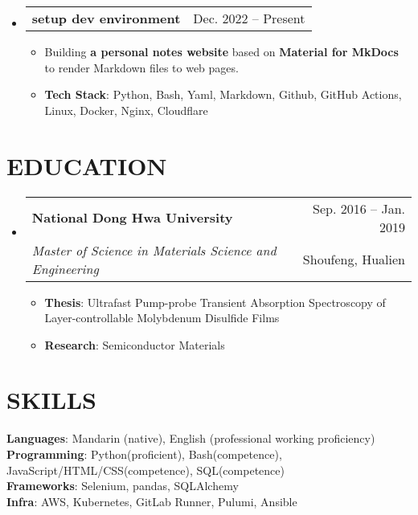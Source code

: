 \documentclass[letterpaper,11pt]{article}
\makeatletter
\newcommand{\resumeItem}[1]{
  \item\small{
    {#1 \vspace{-1pt}}
  }
}
\newcommand{\resumeSubheading}[4]{
  \vspace{-1pt}\item
    \begin{tabular*}{\textwidth}[t]{l@{\extracolsep{\fill}}r}
      \textbf{#1} & {\color{dark-grey}\small #2}\vspace{1pt}\\ %
      \textit{#3} & {\color{dark-grey} \small #4}\\ %
    \end{tabular*}\vspace{-4pt}
}
\newcommand{\resumeProjectHeading}[2]{
    \item
    \begin{tabular*}{\textwidth}{l@{\extracolsep{\fill}}r}
      #1 & {\color{dark-grey} #2} \\  %
    \end{tabular*}\vspace{-4pt}
}
\newcommand{\resumeSubHeadingListStart}{\begin{itemize}[leftmargin=0in, label={}]}
\newcommand{\resumeSubHeadingListEnd}{\end{itemize}}
\newcommand{\resumeItemListStart}{\begin{itemize}}
\newcommand{\resumeItemListEnd}{\end{itemize}\vspace{0pt}}
\makeatother
\begin{document}
    \resumeSubHeadingListStart
    \resumeProjectHeading
        {\textbf{setup dev environment}} {Dec. 2022 -- Present}
        \resumeItemListStart
          \resumeItem{Building \textbf{a personal notes website} based on \textbf{Material for MkDocs} to render Markdown files to web pages.}
          \resumeItem{ \textbf{Tech Stack}: Python, Bash, Yaml, Markdown, Github, GitHub Actions, Linux, Docker, Nginx, Cloudflare}
        \resumeItemListEnd          
    \resumeSubHeadingListEnd

\section {EDUCATION}
\resumeSubHeadingListStart
\resumeSubheading
  {National Dong Hwa University}{Sep. 2016 -- Jan. 2019}
  {Master of Science in Materials Science and Engineering}{Shoufeng, Hualien}
    \resumeItemListStart
  \resumeItem {\textbf{Thesis}: Ultrafast Pump-probe Transient Absorption Spectroscopy of Layer-controllable Molybdenum Disulfide Films}
    \resumeItem 
        {\textbf{Research}: Semiconductor Materials }
    \resumeItemListEnd
\resumeSubHeadingListEnd

%
\section{SKILLS}
 \begin{itemize}[leftmargin=0in, label={}]
    \small{\item{
     \textbf{Languages}{: Mandarin (native), English (professional working proficiency)}\vspace{2pt} \\
     \textbf{Programming}{: Python(proficient), Bash(competence), JavaScript/HTML/CSS(competence), SQL(competence)}\vspace{2pt} \\
     \textbf{Frameworks}{: Selenium, pandas, SQLAlchemy} \\
     \textbf{Infra}{: AWS, Kubernetes, GitLab Runner, Pulumi, Ansible}
    }}
 \end{itemize}


\end{document}
